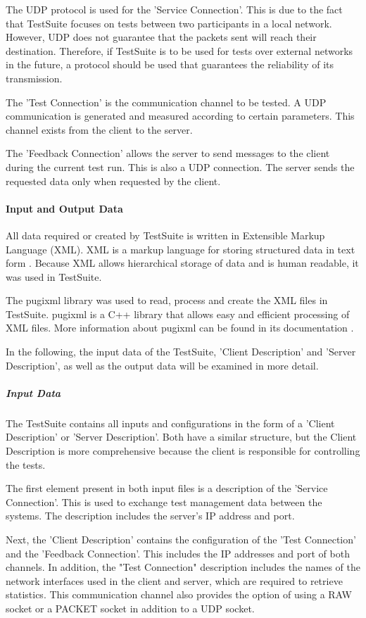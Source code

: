 The UDP protocol is used for the 'Service Connection'. This is due to the fact that TestSuite focuses on tests between two participants in a local network. However, UDP does not guarantee that the packets sent will reach their destination. Therefore, if TestSuite is to be used for tests over external networks in the future, a protocol should be used that guarantees the reliability of its transmission.

The 'Test Connection' is the communication channel to be tested. A UDP communication is generated and measured according to certain parameters. This channel exists from the client to the server.

The 'Feedback Connection' allows the server to send messages to the client during the current test run. This is also a UDP connection. The server sends the requested data only when requested by the client.

\paragraph{Input and Output Data}
All data required or created by TestSuite is written in Extensible Markup Language (XML). XML is a markup language for storing structured data in text form \cite{tsd01}. Because XML allows hierarchical storage of data and is human readable, it was used in TestSuite.

The pugixml library was used to read, process and create the XML files in TestSuite. pugixml is a C++ library that allows easy and efficient processing of XML files. More information about pugixml can be found in its documentation \cite{tsd02}.

In the following, the input data of the TestSuite, 'Client Description' and 'Server Description', as well as the output data will be examined in more detail.

\subparagraph{Input Data}
The TestSuite contains all inputs and configurations in the form of a 'Client Description' or 'Server Description'. Both have a similar structure, but the Client Description is more comprehensive because the client is responsible for controlling the tests.

The first element present in both input files is a description of the 'Service Connection'. This is used to exchange test management data between the systems. The description includes the server's IP address and port.

Next, the 'Client Description' contains the configuration of the 'Test Connection' and the 'Feedback Connection'. This includes the IP addresses and port of both channels. In addition, the "Test Connection" description includes the names of the network interfaces used in the client and server, which are required to retrieve statistics. This communication channel also provides the option of using a RAW socket or a PACKET socket in addition to a UDP socket.

